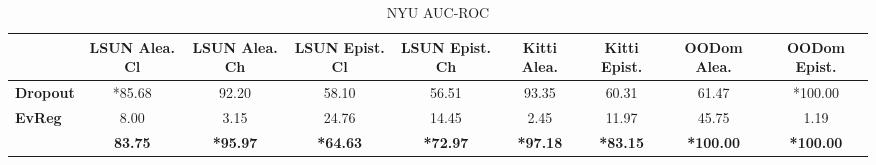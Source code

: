 \begin{table*}[ht]
    \caption{NYU AUC-ROC}
    \centering
    \scriptsize
    \begin{tabular}{lcccccccc}
        \toprule
        & \textbf{LSUN Alea. Cl} & \textbf{LSUN Alea. Ch} & \textbf{LSUN Epist. Cl} & \textbf{LSUN Epist. Ch} & \textbf{Kitti Alea.} & \textbf{Kitti Epist.} & \textbf{OODom Alea.} & \textbf{OODom Epist.} \\
        \midrule
        \textbf{Dropout} & *85.68 & 92.20 & 58.10 & 56.51 & 93.35 & 60.31 & 61.47 & *100.00 \\
        \midrule
        \textbf{EvReg} & 8.00 & 3.15 & 24.76 & 14.45 & 2.45 & 11.97 & 45.75 & 1.19 \\
        \textbf{\oursacro{}} & \textbf{83.75} & \textbf{*95.97} & \textbf{*64.63} & \textbf{*72.97} & \textbf{*97.18} & \textbf{*83.15} & \textbf{*100.00} & \textbf{*100.00} \\
        \bottomrule
    \end{tabular}
\end{table*}
